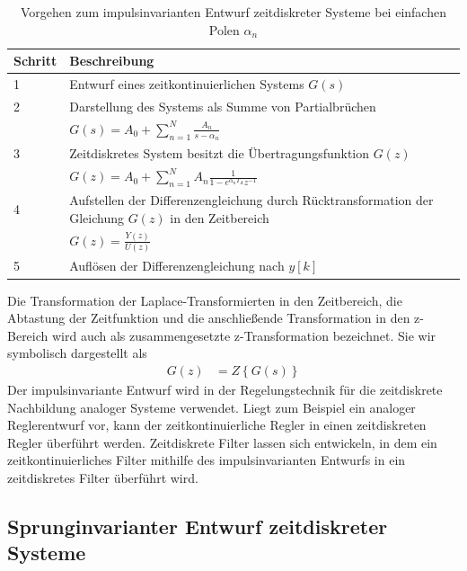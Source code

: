\begin{table}
  \centering
  \caption{Vorgehen zum impulsinvarianten Entwurf zeitdiskreter Systeme bei einfachen Polen \(α_{n}\)}
  \label{tab:9.1}
  \begin{tabular}{ll}
    \toprule
    Schritt & Beschreibung \\
    \midrule
    1 & Entwurf eines zeitkontinuierlichen Systems \(G(s)\) \\
    2 & Darstellung des Systems als Summe von Partialbrüchen \\
    & \(G(s) = A_{0} + \sum\limits_{n = 1}^{N}\frac{A_{n}}{s - \alpha_{n}}\) \\
    3 & Zeitdiskretes System besitzt die Übertragungsfunktion \(G(z)\) \\
    & \(G(z) = A_{0} + \sum\limits_{n = 1}^{N}{A_{n}  \frac{1}{1 - e^{\alpha_{n}  T_{A}}  z^{- 1}}}\) \\
    4 & Aufstellen der Differenzengleichung durch Rücktransformation der Gleichung \(G(z)\) in den Zeitbereich \\
    & \(G(z) = \frac{Y(z)}{U(z)}\) \\
    5 & Auflösen der Differenzengleichung nach \(y[k]\) \\
    \bottomrule
  \end{tabular}
\end{table}

Die Transformation der Laplace-Transformierten in den Zeitbereich, die Abtastung der Zeitfunktion und die anschließende Transformation in den z-Bereich wird auch als zusammengesetzte z-Transformation bezeichnet. Sie wir symbolisch dargestellt als
\begin{align}
G(z) &= Z\left\{ G(s) \right\} \label{eq:9.11}
\end{align}
Der impulsinvariante Entwurf wird in der Regelungstechnik für die zeitdiskrete Nachbildung analoger Systeme verwendet. Liegt zum Beispiel ein analoger Reglerentwurf vor, kann der zeitkontinuierliche Regler in einen zeitdiskreten Regler überführt werden. Zeitdiskrete Filter lassen sich entwickeln, in dem ein zeitkontinuierliches Filter mithilfe des impulsinvarianten Entwurfs in ein zeitdiskretes Filter überführt wird.

\subsection{Sprunginvarianter Entwurf zeitdiskreter Systeme}\label{sec:sprunginvarianter-entwurf-zeitdiskreter-systeme}

